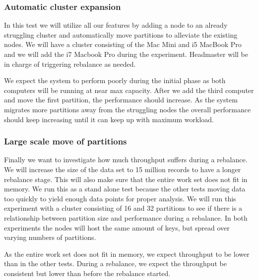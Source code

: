 \subsubsection{Automatic cluster expansion}
In this test we will utilize all our features by adding a node to an already struggling cluster and automatically move partitions to alleviate the existing nodes. We will have a cluster consisting of the Mac Mini and i5 MacBook Pro and we will add the i7 Macbook Pro during the experiment. Headmaster will be in charge of triggering rebalance as needed. 

We expect the system to perform poorly during the initial phase as both computers will be running at near max capacity. After we add the third computer and move the first partition, the performance should increase. As the system migrates more partitions away from the struggling nodes the overall performance should keep increasing until it can keep up with maximum workload. 

\subsubsection{Large scale move of partitions}
Finally we want to investigate how much throughput suffers during a rebalance. We will increase the size of the data set to 15 million records to have a longer rebalance stage. This will also make sure that the entire work set does not fit in memory. We run this as a stand alone test because the other tests moving data too quickly to yield enough data points for proper analysis. We will run this experiment with a cluster consisting of 16 and 32 partitions to see if there is a relationship between partition size and performance during a rebalance. In both experiments the nodes will host the same amount of keys, but spread over varying numbers of partitions.

As the entire work set does not fit in memory, we expect throughput to be lower than in the other tests. During a rebalance, we expect the throughput be consistent but lower than before the rebalance started. 



